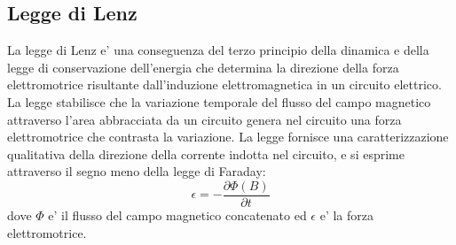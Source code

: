 \documentclass[a4paper, 10pt]{article}
\begin{document}
		\subsection{Legge di Lenz}
			La legge di Lenz e' una conseguenza del terzo principio della dinamica e della legge di conservazione dell'energia che 
			determina la direzione della forza elettromotrice risultante dall'induzione elettromagnetica in un circuito elettrico.
			La legge stabilisce che la variazione temporale del flusso del campo magnetico attraverso l'area abbracciata 
			da un circuito genera nel circuito una forza elettromotrice che contrasta la variazione. La legge fornisce una
			caratterizzazione qualitativa della direzione della corrente indotta nel circuito, e si esprime attraverso 
			il segno meno della legge di Faraday:
			\[ \epsilon = -\frac{\partial \Phi (B)}{\partial t} \] dove $\Phi$ e' il flusso del campo magnetico concatenato ed 
			$\epsilon$ e' la forza elettromotrice.
\end{document}
